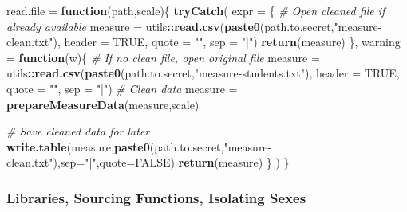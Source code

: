 \documentclass[]{article}
\newenvironment{Shaded}{\begin{snugshade}}{\end{snugshade}}
\newcommand{\CommentTok}[1]{\textcolor[rgb]{0.56,0.35,0.01}{\textit{#1}}}
\newcommand{\ControlFlowTok}[1]{\textcolor[rgb]{0.13,0.29,0.53}{\textbf{#1}}}
\newcommand{\DataTypeTok}[1]{\textcolor[rgb]{0.13,0.29,0.53}{#1}}
\newcommand{\KeywordTok}[1]{\textcolor[rgb]{0.13,0.29,0.53}{\textbf{#1}}}
\newcommand{\NormalTok}[1]{#1}
\newcommand{\OperatorTok}[1]{\textcolor[rgb]{0.81,0.36,0.00}{\textbf{#1}}}
\newcommand{\OtherTok}[1]{\textcolor[rgb]{0.56,0.35,0.01}{#1}}
\newcommand{\StringTok}[1]{\textcolor[rgb]{0.31,0.60,0.02}{#1}}
\begin{document}
\begin{Shaded}
\begin{Highlighting}[]
\NormalTok{read.file =}\StringTok{ }\ControlFlowTok{function}\NormalTok{(path,scale)\{}
  \KeywordTok{tryCatch}\NormalTok{(}
    \DataTypeTok{expr =}\NormalTok{ \{}
      \CommentTok{# Open cleaned file if already available}
\NormalTok{      measure =}\StringTok{ }\NormalTok{utils}\OperatorTok{::}\KeywordTok{read.csv}\NormalTok{(}\KeywordTok{paste0}\NormalTok{(path.to.secret,}\StringTok{"measure-clean.txt"}\NormalTok{),}
                                \DataTypeTok{header =} \OtherTok{TRUE}\NormalTok{, }\DataTypeTok{quote =} \StringTok{""}\NormalTok{, }\DataTypeTok{sep =} \StringTok{"|"}\NormalTok{)}
      \KeywordTok{return}\NormalTok{(measure)}
\NormalTok{    \},}
    \DataTypeTok{warning =} \ControlFlowTok{function}\NormalTok{(w)\{}
      \CommentTok{# If no clean file, open original file}
\NormalTok{      measure =}\StringTok{ }\NormalTok{utils}\OperatorTok{::}\KeywordTok{read.csv}\NormalTok{(}\KeywordTok{paste0}\NormalTok{(path.to.secret,}\StringTok{"measure-students.txt"}\NormalTok{),}
                                \DataTypeTok{header =} \OtherTok{TRUE}\NormalTok{, }\DataTypeTok{quote =} \StringTok{""}\NormalTok{, }\DataTypeTok{sep =} \StringTok{"|"}\NormalTok{)}
      \CommentTok{# Clean data}
\NormalTok{      measure =}\StringTok{ }\KeywordTok{prepareMeasureData}\NormalTok{(measure,scale)}
      
      \CommentTok{# Save cleaned data for later}
      \KeywordTok{write.table}\NormalTok{(measure,}\KeywordTok{paste0}\NormalTok{(path.to.secret,}\StringTok{"measure-clean.txt"}\NormalTok{),}\DataTypeTok{sep=}\StringTok{"|"}\NormalTok{,}\DataTypeTok{quote=}\OtherTok{FALSE}\NormalTok{)}
      \KeywordTok{return}\NormalTok{(measure)}
\NormalTok{    \}}
\NormalTok{  )    }
\NormalTok{\}}
\end{Highlighting}
\end{Shaded}

\subsubsection{Libraries, Sourcing Functions, Isolating Sexes}
\label{sec:sourcing}
\end{document}
